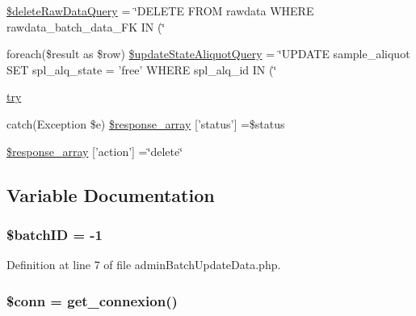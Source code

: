 \begin{DoxyCompactItemize}
\item 
\hyperlink{admin_batch_update_data_8php_ae5af6d755eaaf6ecdff2af55a8b6419f}{\$delete\-Raw\-Data\-Query} = \char`\"{}D\-E\-L\-E\-T\-E F\-R\-O\-M rawdata W\-H\-E\-R\-E rawdata\-\_\-batch\-\_\-data\-\_\-\-F\-K I\-N (\char`\"{}
\item 
foreach(\$result as \$row) \hyperlink{admin_batch_update_data_8php_a9b5699e27fe7cf7436e0ee0f8ca958b7}{\$update\-State\-Aliquot\-Query} = \char`\"{}U\-P\-D\-A\-T\-E sample\-\_\-aliquot S\-E\-T spl\-\_\-alq\-\_\-state = 'free' W\-H\-E\-R\-E spl\-\_\-alq\-\_\-id I\-N (\char`\"{}
\item 
\hyperlink{admin_batch_update_data_8php_abe4cc9788f52e49485473dc699537388}{try}
\item 
catch(Exception \$e) \hyperlink{admin_batch_update_data_8php_a8452fb8131316637a04e25f5fde066d9}{\$response\-\_\-array} \mbox{[}'status'\mbox{]} =\$status
\item 
\hyperlink{admin_batch_update_data_8php_ae768978a0cdc416c0d63d798c85c8784}{\$response\-\_\-array} \mbox{[}'action'\mbox{]} =\char`\"{}delete\char`\"{}
\end{DoxyCompactItemize}


\subsection{Variable Documentation}
\hypertarget{admin_batch_update_data_8php_aaa6d122ea9cb55b210aadd86e5654a74}{
\subsubsection[{\$batch\-I\-D}]{\setlength{\rightskip}{0pt plus 5cm}\${\bf batch\-I\-D} = -\/1}}\label{admin_batch_update_data_8php_aaa6d122ea9cb55b210aadd86e5654a74}


Definition at line 7 of file admin\-Batch\-Update\-Data.\-php.

\hypertarget{admin_batch_update_data_8php_aa8a5a87b9c1a6a0819b88447cbe41877}{
\subsubsection[{\$conn}]{\setlength{\rightskip}{0pt plus 5cm}\$conn = {\bf get\-\_\-connexion}()}}\label{admin_batch_update_data_8php_aa8a5a87b9c1a6a0819b88447cbe41877}


